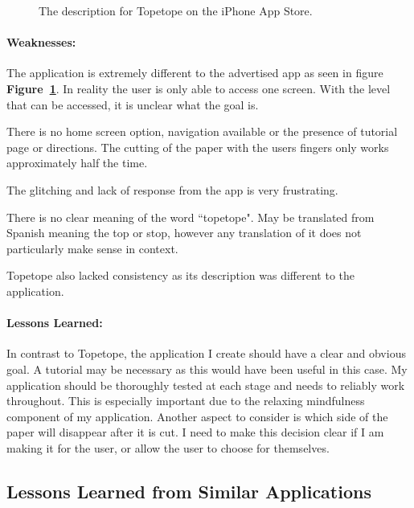 \documentclass[11pt]{article}
\begin{document}
\begin{figure}[!ht]
\begin{minipage}{0.48\textwidth}
                            \captionsetup{margin = 0.5cm}
                            \caption{The description for Topetope on the iPhone App Store.}
                            \label{fig:topeAdvertising}
                        \end{minipage}
                    \end{figure}
                    

                \paragraph{Weaknesses:}
                The application is extremely different to the advertised app as seen in figure \textbf{Figure~\ref{fig:topeAdvertising}}. In reality the user is only able to access one screen. With the level that can be accessed, it is unclear what the goal is.
                
                There is no home screen option, navigation available or the presence of tutorial page or directions. The cutting of the paper with the users fingers only works approximately half the time.
                
                The glitching and lack of response from the app is very frustrating.
                
                
                There is no clear meaning of the word ``topetope". May be translated from Spanish meaning the top or stop, however any translation of it does not particularly make sense in context. 
                
                 Topetope also lacked consistency as its description was different to the application.

                \paragraph{Lessons Learned:}
                In contrast to Topetope, the application I create should have a clear and obvious goal. A tutorial may be necessary as this would have been useful in this case. My application should be thoroughly tested at each stage and needs to reliably work throughout. This is especially important due to the relaxing mindfulness component of my application. Another aspect to consider is which side of the paper will disappear after it is cut. I need to make this decision clear if I am making it for the user, or allow the user to choose for themselves. 


       \subsection{Lessons Learned from Similar Applications}
       
\end{document}
